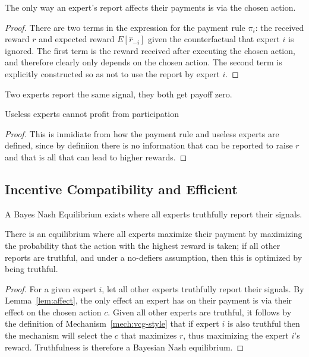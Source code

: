 \begin{lem}\label{lem:affect}
	The only way an expert's report affects their payments is via the chosen action.
\end{lem}

\begin{proof}
There are two terms in the expression for the payment rule $\pi_i$: the received reward $r$ and expected reward $E[\hat{r}_{-i}]$ given the counterfactual that expert $i$ is ignored. 
The first term is the reward received after executing the chosen action, and therefore clearly only depends on the chosen action. 
The second term is explicitly constructed so as not to use the report by expert $i$. 
\end{proof}

\begin{lem}
	Two experts report the same signal, they both get payoff zero. 
\end{lem}


\begin{lem}
	Useless experts cannot profit from participation
\end{lem}

\begin{proof}
This is inmidiate from how the payment rule and useless experts are defined, since by definiion there is no information that can be reported to raise $r$ and that is all that can lead to higher rewards.
\end{proof}


\subsection{Incentive Compatibility and Efficient}

\begin{defn}
	A Bayes Nash Equilibrium exists where all experts truthfully report their signals.
\end{defn}

There is an equilibrium where all experts maximize their payment by maximizing the probability that the action with the highest reward is taken; if all other reports are truthful, and under a no-defiers assumption, then this is optimized by being truthful.

\begin{proof}
For a given expert $i$, let all other experts truthfully report their signals. By Lemma~\ref{lem:affect}, the only effect an expert has on their payment is via their effect on the chosen action $c$. Given all other experts are truthful, it follows by the definition of Mechanism~\ref{mech:vcg-style} that if expert $i$ is also truthful then the mechanism will select the $c$ that maximizes $r$, thus maximizing the expert $i$'s reward. Truthfulness is therefore a Bayesian Nash equilibrium.
\end{proof}

